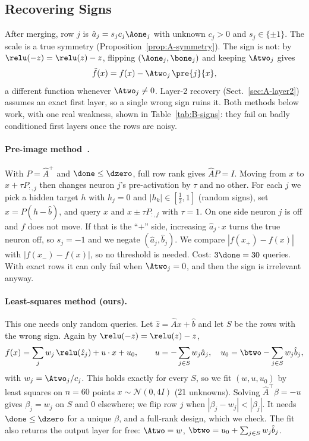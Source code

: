 \subsection{Recovering Signs}
\label{sec:B-signs}

After merging, row $j$ is $\hat a_j=s_jc_j\Aone_j$ with unknown $c_j>0$ and
$s_j\in\{\pm1\}$. The scale is a true symmetry
(Proposition~\ref{prop:A-symmetry}). The sign is not: by
$\relu(-z)=\relu(z)-z$, flipping $(\Aone_j,\bone_j)$ and keeping $\Atwo_j$ gives
\begin{equation}\label{eq:B-flip}
  \tilde f(x)=f(x)-\Atwo_j\,\pre{j}{x},
\end{equation}
a different function whenever $\Atwo_j\neq0$. Layer-2 recovery
(Sect.~\ref{sec:A-layer2}) assumes an exact first layer, so a single wrong
sign ruins it. Both methods below work, with one real weakness, shown in
Table~\ref{tab:B-signs}: they fail on badly conditioned first layers once
the rows are noisy.

\paragraph{Pre-image method~\cite[\S4.2]{DBLP:conf/crypto/CarliniJM20}.}
With $P=\hat A^{+}$ and $\done\le\dzero$, full row rank gives $\hat AP=I$.
Moving from $x$ to $x+\tau P_{:,j}$ then changes neuron $j$'s pre-activation by
$\tau$ and no other. For each $j$ we pick a hidden target $h$ with $h_j=0$ and
$|h_k|\in[\tfrac12,1]$ (random signs), set $x=P(h-\hat b)$, and query $x$ and
$x\pm\tau P_{:,j}$ with $\tau=1$. On one side neuron $j$ is off and $f$ does
not move. If that is the ``$+$'' side, increasing $\hat a_j\cdot x$ turns the
true neuron off, so $s_j=-1$ and we negate $(\hat a_j,\hat b_j)$. We compare
$|f(x_+)-f(x)|$ with $|f(x_-)-f(x)|$, so no threshold is needed. Cost:
$3\done=30$ queries. With exact rows it can only fail when $\Atwo_j=0$, and then the sign is
irrelevant anyway.

\paragraph{Least-squares method (ours).}
This one needs only random queries. Let $\hat z=\hat A x+\hat b$ and let $S$
be the rows with the wrong sign. Again by $\relu(-z)=\relu(z)-z$,
\begin{equation}\label{eq:B-lstsq}
  f(x)=\sum_{j}w_j\,\relu(\hat z_j)+u\cdot x+u_0,\qquad
  u=-\sum_{j\in S}w_j\hat a_j,\quad u_0=\btwo-\sum_{j\in S}w_j\hat b_j,
\end{equation}
with $w_j=\Atwo_j/c_j$. This holds exactly for every $S$, so we fit
$(w,u,u_0)$ by least squares on $n=60$ points $x\sim\mathcal N(0,4I)$
($21$ unknowns). Solving $\hat A^{\top}\beta=-u$ gives $\beta_j=w_j$ on $S$ and
$0$ elsewhere; we flip row $j$ when $|\beta_j-w_j|<|\beta_j|$. It needs
$\done\le\dzero$ for a unique $\beta$, and a full-rank design, which we check.
The fit also returns the output layer for free: $\Atwo=w$,
$\btwo=u_0+\sum_{j\in S}w_j\hat b_j$.

